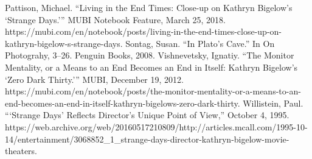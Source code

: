 \documentclass[a4paper, 12pt]{article}
\begin{document}
Pattison, Michael. “Living in the End Times: Close-up on Kathryn Bigelow’s ‘Strange Days.’” MUBI Notebook Feature, March 25, 2018. https://mubi.com/en/notebook/posts/living-in-the-end-times-close-up-on-kathryn-bigelow-s-strange-days.
Sontag, Susan. “In Plato’s Cave.” In On Photograhy, 3–26. Penguin Books, 2008.
Vishnevetsky, Ignatiy. “The Monitor Mentality, or a Means to an End Becomes an End in Itself: Kathryn Bigelow’s ‘Zero Dark Thirty.’” MUBI, December 19, 2012. https://mubi.com/en/notebook/posts/the-monitor-mentality-or-a-means-to-an-end-becomes-an-end-in-itself-kathryn-bigelows-zero-dark-thirty.
Willistein, Paul. “‘Strange Days’ Reflects Director’s Unique Point of View,” October 4, 1995. https://web.archive.org/web/20160517210809/http://articles.mcall.com/1995-10-14/entertainment/3068852_1_strange-days-director-kathryn-bigelow-movie-theaters.



	
	
	
	
\end{document}
